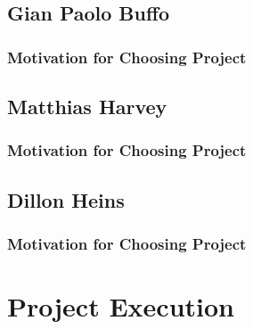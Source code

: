 \documentclass{article}
\begin{document}
	\cleardoublepage		
		
	\subsection{Gian Paolo Buffo}
		\subsubsection{Motivation for Choosing Project}

	\cleardoublepage

	\subsection{Matthias Harvey}
		\subsubsection{Motivation for Choosing Project}
	
	\cleardoublepage
	
	\subsection{Dillon Heins}
		\subsubsection{Motivation for Choosing Project}

\cleardoublepage
    
\section{Project Execution}
\end{document}
